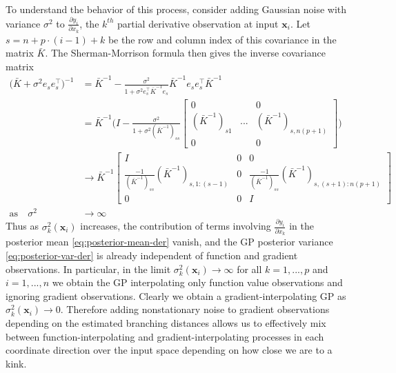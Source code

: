 \documentclass{article}
\newcommand{\mat}[1]{\begin{bmatrix}#1\end{bmatrix}}
\renewcommand{\vec}[1]{\mathbf{#1}}
\numberwithin{equation}{section}
\begin{document}
To understand the behavior of this process, consider adding Gaussian noise with variance $\sigma^2$ to $\frac{\partial y_i}{\partial x_k}$, the $k^{th}$ partial derivative observation at input $\vec{x}_i$. Let $s = n + p \cdot (i-1) + k$ be the row and column index of this covariance in the matrix $\bar{K}$. The Sherman-Morrison formula then gives the inverse covariance matrix
\begin{align*}
  \Big(\bar{K} + \sigma^2 e_s e_s^\top\Big)^{-1}
  & = \bar{K}^{-1} - \frac{\sigma^2}{1 + \sigma^2 e_s^\top \bar{K}^{-1} e_s} \bar{K}^{-1} e_s e_s^\top \bar{K}^{-1} \\
  & = \bar{K}^{-1} \Bigg(I - \frac{\sigma^2}{1 + \sigma^2 (\bar{K}^{-1})_{ss}} \mat{0 & & 0 \\ (\bar{K}^{-1})_{s1} & ... & (\bar{K}^{-1})_{s,n(p+1)} \\ 0 & & 0} \Bigg) \\
  & \to \bar{K}^{-1} \mat{ I & 0 & 0 \\ \frac{-1}{(\bar{K}^{-1})_{ss}}(\bar{K}^{-1})_{s,1:(s-1)} & 0 & \frac{-1}{(\bar{K}^{-1})_{ss}}(\bar{K}^{-1})_{s,(s+1):n(p+1)} \\ 0 & 0 & I } \\
  \text{as} \quad \sigma^2 & \to \infty
\end{align*}
Thus as $\sigma^2_k(\vec{x}_i)$ increases, the contribution of terms involving $\frac{\partial y_i}{\partial x_k}$ in the posterior mean \eqref{eq:posterior-mean-der} vanish, and the GP posterior variance \eqref{eq:posterior-var-der} is already independent of function and gradient observations. In particular, in the limit $\sigma^2_k(\vec{x}_i) \to \infty$
for all $k=1,...,p$ and $i=1,...,n$ we obtain the GP interpolating only function value observations and ignoring gradient observations. Clearly we obtain a gradient-interpolating GP as $\sigma^2_k(\vec{x}_i) \to 0$. Therefore adding nonstationary noise to gradient observations depending on the estimated branching distances allows us to effectively mix between function-interpolating and gradient-interpolating processes in each coordinate direction over the input space depending on how close we are to a kink.
\end{document}
